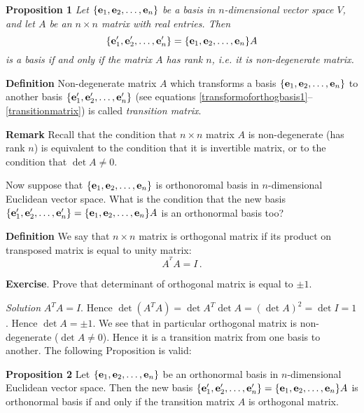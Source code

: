 \documentclass[12pt]{article}
\numberwithin{equation}{section}
\begin{document}
{\bf Proposition 1} {\it Let $\{{\bf e}_1,{\bf e}_2,\dots,{\bf e}_n\}$ be a basis in $n$-dimensional
 vector space $V$, and let $A$ be an
$n\times n$ matrix with real entries.
Then 
                      \begin{equation}\label{transitionmatrix}
                      \{{\bf e}'_1,{\bf e}'_2,\dots,{\bf e}'_n\}=\{{\bf e}_1,{\bf e}_2,\dots,{\bf e}_n\}A
                       \end{equation}
                       is a basis if and only if the matrix
$A$ has rank $n$, i.e. it is non-degenerate matrix.}

\m


 {\bf Definition } Non-degenerate matrix $A$ which transforms a basis $\{{\bf e}_1,{\bf e}_2,\dots,{\bf e}_n\}$
  to another basis  $\{{\bf e}'_1,{\bf e}'_2,\dots,{\bf e}'_n\}$ (see equations \eqref{transformoforthogbasis1}-- \eqref{transitionmatrix})
  is called {\it transition matrix}.
  
{\bf Remark}  Recall that  the condition that $n\times n$ matrix $A$ is non-degenerate 
(has rank $n$) is equivalent to the condition that it is invertible matrix, 
or to the condition that $\det A\not=0$.

Now suppose that  $\{{\bf e}_1,{\bf e}_2,\dots,{\bf e}_n\}$ is orthonoromal basis in $n$-dimensional Euclidean
vector space.   What is the condition that  the new basis
$\{{\bf e}'_1,{\bf e}'_2,\dots,{\bf e}'_n\}=\{{\bf e}_1,{\bf e}_2,\dots,{\bf e}_n\}A$ is an orthonormal  basis too?

\m

{\bf Definition}  We say that $n\times n$ matrix is orthogonal matrix if its product on transposed matrix is equal to unity matrix:
                \begin{equation}\label{defofofthogonal}
                    A^{^T}A=I\,.
                \end{equation}

 {\bf Exercise}. Prove that determinant of orthogonal matrix is equal to $\pm 1$.

 {\sl Solution}  $A^TA=I$. Hence $\det (A^TA)=\det A^T\det A=(\det A)^2=\det I=1$. Hence $\det A=\pm 1$.
   We see that in particular orthogonal matrix is non-degenerate ($\det A\not=0$). Hence it is a transition matrix from one basis to another.      The following  Proposition is valid:

{\bf Proposition 2}  Let $\{{\bf e}_1,{\bf e}_2,\dots,{\bf e}_n\}$ be  an orthonormal basis in $n$-dimensional Euclidean
vector space.  Then the new basis  $\{{\bf e}'_1,{\bf e}'_2,\dots,{\bf e}'_n\}=\{{\bf e}_1,{\bf e}_2,\dots,{\bf e}_n\}A$ is orthonormal basis if and only if the transition matrix $A$ is orthogonal matrix.
\end{document}
